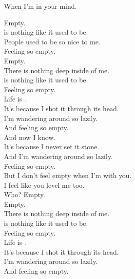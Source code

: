 When I'm in your mind. \\





Empty. \\

 is nothing like it used to be. \\
People used to be so nice to me. \\
Feeling so empty. \\
Empty. \\

There is nothing deep inside of me. \\
 is nothing like it used to be. \\
Feeling so empty. \\

Life is . \\
It's because I shot it through its head. \\
I'm wandering around so lazily. \\
And feeling so empty. \\

And now I know. \\
It's because I never set it stone. \\
And I'm wandering around so lazily. \\
Feeling so empty. \\

But I don't feel empty when I'm with you. \\
I feel like you level me too. \\
Who? Empty. \\
Empty. \\

There is nothing deep inside of me. \\
 is nothing like it used to be. \\
Feeling so empty. \\

Life is . \\
It's because I shot it through its head. \\
I'm wandering around so lazily. \\
And feeling so empty. \\

